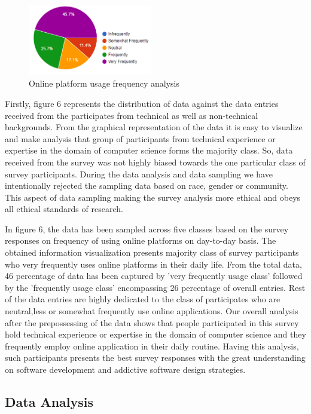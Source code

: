 \documentclass[conference]{IEEEtran}
\begin{document}
\begin{figure}[htbp]
\centerline{\includegraphics[width=0.48\textwidth]{Usage Frequency.PNG}}
\caption{Online platform usage frequency analysis}
\label{fig}
\end{figure}
Firstly, figure 6  represents the distribution of data against the data entries received from the participates from technical as well as non-technical backgrounds. From the graphical representation of the data it is easy to visualize and make analysis that group of participants from technical experience or expertise in the domain of computer science forms the majority class. So, data received from the survey was not highly biased towards the one particular class of survey participants. During the data analysis and data sampling we have intentionally rejected the sampling data based on race, gender or community. This aspect of data sampling making the survey analysis more ethical and obeys all ethical standards of research. 

In figure 6, the data has been sampled across five classes based on the survey responses on frequency of using online platforms on day-to-day basis. The obtained information visualization presents  majority class of survey participants who very frequently uses online platforms in their daily life. From the total data, 46 percentage of data has been captured by 'very frequently usage class' followed by the 'frequently usage class' encompassing 26 percentage of overall entries. Rest of the data entries are highly dedicated to the class of participates who are neutral,less or somewhat frequently use online applications. Our overall analysis after the prepossessing of the data shows that people participated in this survey hold technical experience or expertise in the domain of computer science and they frequently employ online application in their daily routine. Having this analysis, such participants presents the best survey responses with the great understanding on software development and addictive software design strategies.

\subsection{Data Analysis}
\end{document}
